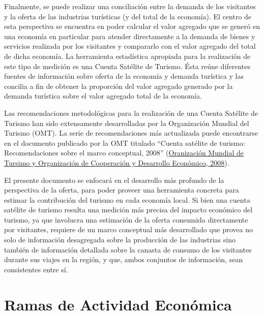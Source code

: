 \documentclass[
  openany]{book}
\begin{document}
Finalmente, se puede realizar una conciliación entre la demanda de los visitantes y la oferta de las industrias turísticas (y del total de la economía). El centro de esta perspectiva se encuentra en poder calcular el valor agregado que se generó en una economía en particular para atender directamente a la demanda de bienes y servicios realizada por los visitantes y compararlo con el valor agregado del total de dicha economía. La herramienta estadística apropiada para la realización de este tipo de medición es una Cuenta Satélite de Turismo. Ésta reúne diferentes fuentes de información sobre oferta de la economía y demanda turística y las concilia a fin de obtener la proporción del valor agregado generado por la demanda turística sobre el valor agregado total de la economía.

Las recomendaciones metodológicas para la realización de una Cuenta Satélite de Turismo han sido extensamente desarrolladas por la Organización Mundial del Turismo (OMT). La serie de recomendaciones más actualizada puede encontrarse en el documento publicado por la OMT titulado ``Cuenta satélite de turismo: Recomendaciones sobre el marco conceptual, 2008'' (\protect\hyperlink{ref-cstrmc2008}{Oranización Mundial de Tursimo y Organización de Cooperación y Desarrollo Económico, 2008}).

El presente documento se enfocará en el desarrollo más profundo de la perspectiva de la oferta, para poder proveer una herramienta concreta para estimar la contribución del turismo en cada economía local. Si bien una cuenta satélite de turismo resulta una medición más precisa del impacto económico del turismo, ya que involucra una estimación de la oferta consumida directamente por visitantes, requiere de un marco conceptual más desarrollado que provea no solo de información desagregada sobre la producción de las industrias sino también de información detallada sobre la canasta de consumo de los visitantes durante sus viajes en la región, y que, ambos conjuntos de información, sean consistentes entre sí.

\hypertarget{ramas-de-actividad-econuxf3mica}{%
\section{Ramas de Actividad Económica}\label{ramas-de-actividad-econuxf3mica}}
\end{document}

